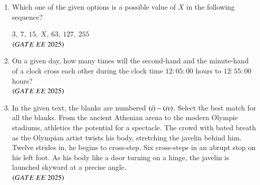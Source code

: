 \documentclass[journal,12pt,onecolumn]{IEEEtran}
\theoremstyle{remark}
\begin{document}
\begin{enumerate}
\item  Which one of the given options is a possible value of $ X $ in the following sequence?


$3,\ 7,\ 15,\ X,\ 63,\ 127,\ 255$
\\
\hfill $\left(GATE\ EE\ 2025\right)$
    \begin{enumerate}
    \end{enumerate}
\item  On a given day, how many times will the second-hand and the minute-hand of a clock cross each other during the clock time $12:05:00$ hours to $12:55:00$ hours?\\
\hfill $\left(GATE\ EE\ 2025\right)$
    \begin{enumerate}
    \end{enumerate}
\item In the given text, the blanks are numbered $\left(i\right)- \left(iv\right)$. Select the best match for all the blanks.
From the ancient Athenian arena to the modern Olympic stadiums, athletics \underline{} the potential for a spectacle. The crowd \underline{} with bated breath as the Olympian artist twists his body, stretching the javelin behind him. Twelve strides in, he begins to cross-step. Six cross-steps \underline{} in an abrupt stop on his left foot. As his body \underline{} like a door turning on a hinge, the javelin is launched skyward at a precise angle. \\   
\hfill $\left(GATE\ EE\ 2025\right)$
    \begin{enumerate}
    

\end{enumerate}
\end{enumerate}
\end{document}
